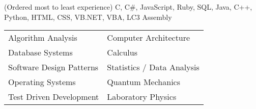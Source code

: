 \documentclass[10pt]{article}
\newcommand{\simsbullet}{{\raisebox{2pt}{\tiny $\bullet$}}\hspace{8pt}}
\begin{document}
\vskip 10pt
{ (Ordered most to least experience)}
\vskip 2pt
\hspace*{12pt} {\sffamily C, C\#, JavaScript, Ruby, SQL, Java, C++, Python, HTML, CSS, VB.NET, VBA, LC3 Assembly}

\vskip 10pt

{}

\vskip 4pt

\setlength{\leftskip}{16pt}


  \begin{tabular}{ l@{\hskip 2.2in} l }

    \simsbullet Algorithm Analysis & \simsbullet Computer Architecture \\
    \simsbullet Database Systems & \simsbullet Calculus \\
    \simsbullet Software Design Patterns & \simsbullet Statistics / Data Analysis\\
    \simsbullet Operating Systems & \simsbullet Quantum Mechanics \\
    \simsbullet Test Driven Development & \simsbullet Laboratory Physics \\

  \end{tabular}


\setlength{\leftskip}{0pt}



\end{document}
